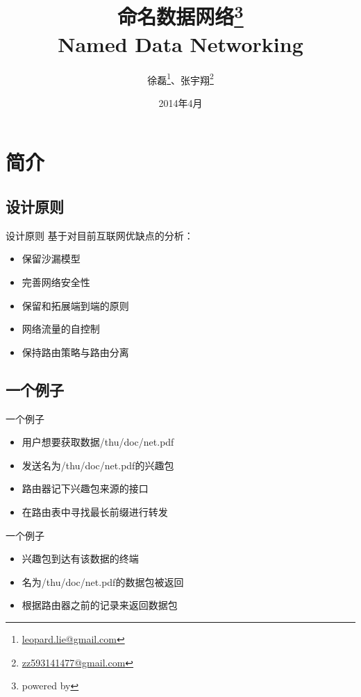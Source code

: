 \documentclass[mathserif]{beamer}
\begin{document}
\title{命名数据网络\thanks{powered by \XeLaTeX}\\Named Data Networking}
\author{徐磊\thanks{\href{mailto:leopard.lie@gmail.com}{leopard.lie@gmail.com}}、张宇翔\thanks{\href{mailto:zz593141477@gmail.com}{zz593141477@gmail.com}}}
\date{2014年4月}

\begin{frame}
  \titlepage
\end{frame}


\section{简介}
\subsection{设计原则}
\begin{frame}{设计原则}
  基于对目前互联网优缺点的分析：
  \begin{itemize}
  \item 保留沙漏模型
  \item 完善网络安全性
  \item 保留和拓展端到端的原则
  \item 网络流量的自控制
  \item 保持路由策略与路由分离
  \end{itemize}
\end{frame}

\subsection{一个例子}
\begin{frame}{一个例子}
  \begin{itemize}
  \item<1> 用户想要获取数据/thu/doc/net.pdf
  \item<2> 发送名为/thu/doc/net.pdf的兴趣包
  \item<3> 路由器记下兴趣包来源的接口
  \item<4> 在路由表中寻找最长前缀进行转发
  \end{itemize}
\end{frame}

\begin{frame}{一个例子}
  \begin{itemize}
  \item<1> 兴趣包到达有该数据的终端
  \item<2> 名为/thu/doc/net.pdf的数据包被返回
  \item<3> 根据路由器之前的记录来返回数据包
  \end{itemize}
\end{frame}
\end{document}
